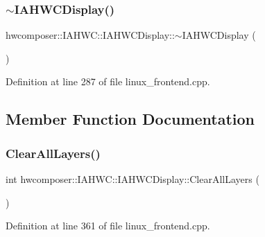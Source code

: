 \subsubsection{\texorpdfstring{$\sim$\+I\+A\+H\+W\+C\+Display()}{~IAHWCDisplay()}}
{\footnotesize\ttfamily hwcomposer\+::\+I\+A\+H\+W\+C\+::\+I\+A\+H\+W\+C\+Display\+::$\sim$\+I\+A\+H\+W\+C\+Display (\begin{DoxyParamCaption}{ }\end{DoxyParamCaption})}



Definition at line 287 of file linux\+\_\+frontend.\+cpp.


\begin{DoxyCode}{0}
\end{DoxyCode}


\subsection{Member Function Documentation}
\mbox{\label{classhwcomposer_1_1IAHWC_1_1IAHWCDisplay_a5dcd39e69f99da275fa1d7b64f0dd3b2}} 
\subsubsection{\texorpdfstring{Clear\+All\+Layers()}{ClearAllLayers()}}
{\footnotesize\ttfamily int hwcomposer\+::\+I\+A\+H\+W\+C\+::\+I\+A\+H\+W\+C\+Display\+::\+Clear\+All\+Layers (\begin{DoxyParamCaption}{ }\end{DoxyParamCaption})}



Definition at line 361 of file linux\+\_\+frontend.\+cpp.


